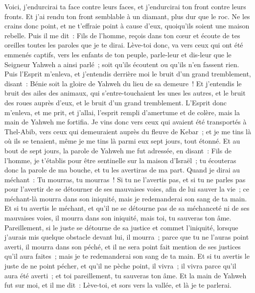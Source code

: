 \begin{multicols}{2}
Voici, j'endurcirai ta face contre leurs faces, et j'endurcirai ton front contre leurs fronts.
Et j'ai rendu ton front semblable à un diamant, plus dur que le roc. Ne les crains donc point, et ne t'effraie point à cause d'eux, quoiqu'ils soient une maison rebelle.
Puis il me dit~: Fils de l'homme, reçois dans ton cœur et écoute de tes oreilles toutes les paroles que je te dirai.
Lève-toi donc, va vers ceux qui ont été emmenés captifs, vers les enfants de ton peuple, parle-leur et dis-leur que le Seigneur Yahweh a ainsi parlé~; soit qu'ils écoutent ou qu'ils n'en fassent rien.
Puis l'Esprit m'enleva, et j'entendis derrière moi le bruit d'un grand tremblement, disant~: Bénie soit la gloire de Yahweh du lieu de sa demeure~!
Et j'entendis le bruit des ailes des animaux, qui s'entre-touchaient les unes les autres, et le bruit des roues auprès d'eux, et le bruit d'un grand tremblement.
L'Esprit donc m'enleva, et me prit, et j'allai, l'esprit rempli d'amertume et de colère, mais la main de Yahweh me fortifia.
Je vins donc vers ceux qui avaient été transportés à Thel-Abib, vers ceux qui demeuraient auprès du fleuve de Kebar~; et je me tins là où ils se tenaient, même je me tins là parmi eux sept jours, tout étonné.
Et au bout de sept jours, la parole de Yahweh me fut adressée, en disant~:
Fils de l'homme, je t'établis pour être sentinelle sur la maison d'Israël~; tu écouteras donc la parole de ma bouche, et tu les avertiras de ma part.
Quand je dirai au méchant~: Tu mourras, tu mourras~! Si tu ne l'avertis pas, et si tu ne parles pas pour l'avertir de se détourner de ses mauvaises voies, afin de lui sauver la vie~; ce méchant-là mourra dans son iniquité, mais je redemanderai son sang de ta main.
Et si tu avertis le méchant, et qu'il ne se détourne pas de sa méchanceté ni de ses mauvaises voies, il mourra dans son iniquité, mais toi, tu sauveras ton âme.
Pareillement, si le juste se détourne de sa justice et commet l'iniquité, lorsque j'aurais mis quelque obstacle devant lui, il mourra~; parce que tu ne l'auras point averti, il mourra dans son péché, et il ne sera point fait mention de ses justices qu'il aura faites~; mais je te redemanderai son sang de ta main.
Et si tu avertis le juste de ne point pécher, et qu'il ne pèche point, il vivra~; il vivra parce qu'il aura été averti~; et toi pareillement, tu sauveras ton âme.
Et la main de Yahweh fut sur moi, et il me dit~: Lève-toi, et sors vers la vallée, et là je te parlerai.

\end{multicols}
